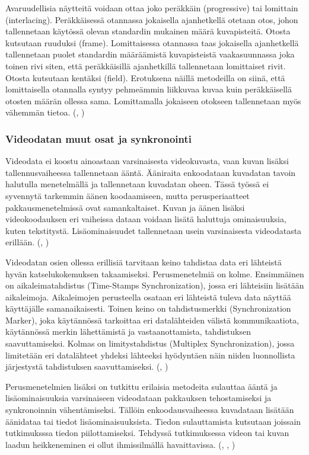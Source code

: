 Avaruudellisia näytteitä voidaan ottaa joko peräkkäin (progressive) tai
lomittain (interlacing). Peräkkäisessä otannassa jokaisella ajanhetkellä
otetaan otos, johon tallennetaan käytössä olevan standardin mukainen
määrä kuvapisteitä. Otosta kutsutaan ruuduksi (frame). Lomittaisessa
otannassa taas jokaisella ajanhetkellä tallennetaan puolet standardin
määräämistä kuvapisteistä vaakasuunnassa joka toinen rivi siten, että
peräkkäisillä ajanhetkillä tallennetaan lomittaiset rivit. Otosta kutsutaan
kentäksi (field). Erotuksena näillä metodeilla on siinä, että lomittaisella
otannalla syntyy pehmeämmin liikkuvaa kuvaa kuin peräkkäisellä otosten määrän
ollessa sama. Lomittamalla jokaiseen otokseen tallennetaan myös vähemmän tietoa.
(\citealt{h264}, \citealt{du})

\subsubsection{Videodatan muut osat ja synkronointi}

Videodata ei koostu ainoastaan varsinaisesta videokuvasta, vaan kuvan lisäksi
tallennusvaiheessa tallennetaan ääntä. Ääniraita enkoodataan kuvadatan tavoin
halutulla menetelmällä ja tallennetaan kuvadatan oheen. Tässä
työssä ei syvennytä tarkemmin äänen koodaamiseen, mutta perusperiaatteet
pakkausmenetelmissä ovat samankaltaiset. Kuvan ja äänen lisäksi videokoodauksen
eri vaiheissa dataan voidaan lisätä haluttuja ominaisuuksia, kuten tekstitystä.
Lisäominaisuudet tallennetaan usein varsinaisesta videodatasta erillään. (\citealt{mpeg_app},
\citealt{mujal})
 
Videodatan osien ollessa erillisiä tarvitaan keino tahdistaa data eri
lähteistä hyvän katselukokemuksen takaamiseksi. Perusmenetelmiä on kolme.
Ensimmäinen on aikaleimatahdistus (Time-Stamps Synchronization), jossa eri
lähteisiin lisätään aikaleimoja. Aikaleimojen perusteella osataan eri lähteistä
tuleva data näyttää käyttäjälle samanaikaisesti. Toinen keino on
tahdistusmerkki (Synchronization Marker), joka käytännössä tarkoittaa eri datalähteiden välistä
kommunikaatiota, käytännössä merkin lähettämistä ja vastaanottamista, tahdistuksen
saavuttamiseksi. Kolmas on limitystahdistus (Multiplex Synchronization), jossa
limitetään eri datalähteet yhdeksi lähteeksi hyödyntäen näin niiden
luonnollista järjestystä tahdistuksen saavuttamiseksi. (\citealt{sync}, \citealt{mujal})

Perusmenetelmien lisäksi on tutkittu erilaisia metodeita
sulauttaa ääntä ja lisäominaisuuksia varsinaiseen videodataan pakkauksen tehostamiseksi
ja synkronoinnin vähentämiseksi.
Tällöin enkoodausvaiheessa kuvadataan lisätään äänidataa tai tiedot lisäominaisuuksista.
Tiedon sulauttamista kutsutaan joissain tutkimuksssa tiedon piilottamiseksi.
Tehdyssä tutkimuksessa videon tai kuvan laadun heikkeneminen ei ollut ihmissilmällä
havaittavissa. (\citealt{sync}, \citealt{mujal}, \citealt{hiding})

